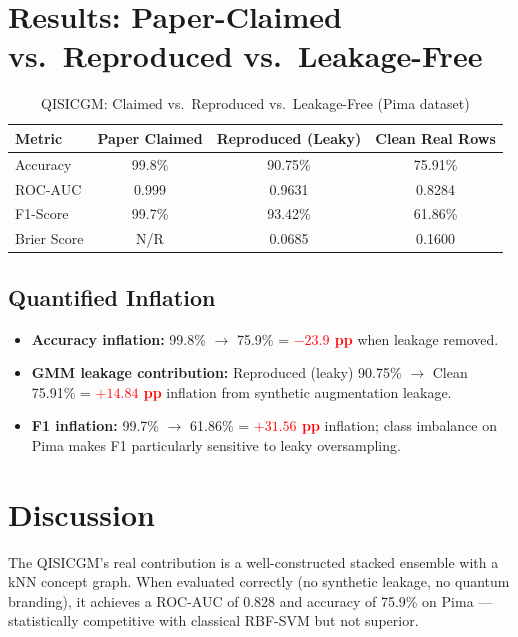 \documentclass[12pt,a4paper]{article}
\begin{document}
\section{Results: Paper-Claimed vs.\ Reproduced vs.\ Leakage-Free}
\begin{table}[h!]
  \centering
  \caption{QISICGM: Claimed vs.\ Reproduced vs.\ Leakage-Free (Pima dataset)}
  \begin{tabular}{lccc}
    \toprule
    \textbf{Metric} & \textbf{Paper Claimed} & \textbf{Reproduced (Leaky)} & \textbf{Clean Real Rows}\\
    \midrule
    Accuracy   & 99.8\%  & 90.75\% & 75.91\%\\
    ROC-AUC    & 0.999   & 0.9631  & 0.8284\\
    F1-Score   & 99.7\%  & 93.42\% & 61.86\%\\
    Brier Score& N/R     & 0.0685  & 0.1600\\
    \bottomrule
  \end{tabular}
\end{table}

\subsection{Quantified Inflation}
\begin{itemize}[leftmargin=*]
  \item \textbf{Accuracy inflation:} 99.8\% $\to$ 75.9\% = \textcolor{red}{\textbf{$-23.9$ pp}} when leakage removed.
  \item \textbf{GMM leakage contribution:} Reproduced (leaky) 90.75\% $\to$ Clean 75.91\% = \textcolor{red}{\textbf{$+14.84$ pp}} inflation from synthetic augmentation leakage.
  \item \textbf{F1 inflation:} 99.7\% $\to$ 61.86\% = \textcolor{red}{\textbf{$+31.56$ pp}} inflation; class imbalance on Pima makes F1 particularly sensitive to leaky oversampling.
\end{itemize}

\section{Discussion}
The QISICGM's real contribution is a well-constructed stacked ensemble with a kNN concept graph. When evaluated correctly (no synthetic leakage, no quantum branding), it achieves a ROC-AUC of 0.828 and accuracy of 75.9\% on Pima --- statistically competitive with classical RBF-SVM but not superior.
\end{document}
